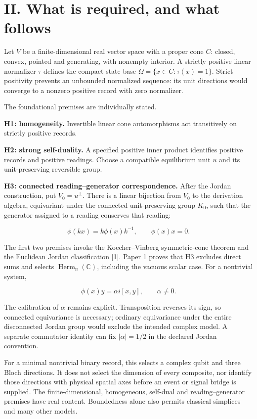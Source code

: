 \documentclass[
  11pt,
  a4paper,
]{article}
\newcounter{none} %
\begin{document}
\section{II. What is required, and what follows}\label{ii.-what-is-required-and-what-follows}

Let \(V\) be a finite-dimensional real vector space with a proper cone \(C\): closed, convex, pointed and generating, with nonempty interior. A strictly positive linear normalizer \(\tau\) defines the compact state base \(\Omega=\{x\in C:\tau(x)=1\}\). Strict positivity prevents an unbounded normalized sequence: its unit directions would converge to a nonzero positive record with zero normalizer.

The foundational premises are individually stated.

\textbf{H1: homogeneity.} Invertible linear cone automorphisms act transitively on strictly positive records.

\textbf{H2: strong self-duality.} A specified positive inner product identifies positive records and positive readings. Choose a compatible equilibrium unit \(u\) and its unit-preserving reversible group.

\textbf{H3: connected reading--generator correspondence.} After the Jordan construction, put \(V_0=u^\perp\). There is a linear bijection from \(V_0\) to the derivation algebra, equivariant under the connected unit-preserving group \(K_0\), such that the generator assigned to a reading conserves that reading:

\[\phi(kx)=k\phi(x)k^{-1},\qquad \phi(x)x=0.\]

The first two premises invoke the Koecher--Vinberg symmetric-cone theorem and the Euclidean Jordan classification {[}1{]}. Paper 1 proves that H3 excludes direct sums and selects \(\operatorname{Herm}_n(\mathbb C)\), including the vacuous scalar case. For a nontrivial system,

\[\phi(x)y=\alpha i[x,y],\qquad \alpha\ne0.\]

The calibration of \(\alpha\) remains explicit. Transposition reverses its sign, so connected equivariance is necessary; ordinary equivariance under the entire disconnected Jordan group would exclude the intended complex model. A separate commutator identity can fix \(|\alpha|=1/2\) in the declared Jordan convention.

For a minimal nontrivial binary record, this selects a complex qubit and three Bloch directions. It does not select the dimension of every composite, nor identify those directions with physical spatial axes before an event or signal bridge is supplied. The finite-dimensional, homogeneous, self-dual and reading--generator premises have real content. Boundedness alone also permits classical simplices and many other models.
\end{document}
